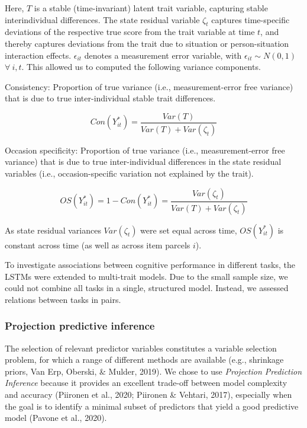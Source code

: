 \documentclass[
  man,floatsintext]{apa6}
\begin{document}
Here, \(T\) is a stable (time-invariant) latent trait variable, capturing stable interindividual differences. The state residual variable \(\zeta_t\) captures time-specific deviations of the respective true score from the trait variable at time \(t\), and thereby captures deviations from the trait due to situation or person-situation interaction effects. \(\epsilon_{it}\) denotes a measurement error variable, with \(\epsilon_{it} \sim N(0,1)\) \(\forall~ i,t\). This allowed us to computed the following variance components.

Consistency: Proportion of true variance (i.e., measurement-error free variance) that is due to true inter-individual stable trait differences.

\begin{equation}
Con(Y^*_{it})=\frac{Var(T)}{Var(T)+Var(\zeta_t)}
\end{equation}

Occasion specificity: Proportion of true variance (i.e., measurement-error free variance) that is due to true inter-individual differences in the state residual variables (i.e., occasion-specific variation not explained by the trait).

\begin{equation}
OS(Y^*_{it})=1-Con(Y^*_{it}) = \frac{Var(\zeta_t)}{Var(T)+Var(\zeta_t)}
\end{equation}

As state residual variances \(Var(\zeta_t)\) were set equal across time, \(OS(Y^*_{it})\) is constant across time (as well as across item parcels \(i\)).

To investigate associations between cognitive performance in different tasks, the LSTMs were extended to multi-trait models. Due to the small sample size, we could not combine all tasks in a single, structured model. Instead, we assessed relations between tasks in pairs.

\hypertarget{projection-predictive-inference}{%
\subsubsection{Projection predictive inference}\label{projection-predictive-inference}}

The selection of relevant predictor variables constitutes a variable selection problem, for which a range of different methods are available (e.g., shrinkage priors, Van Erp, Oberski, \& Mulder, 2019). We chose to use \emph{Projection Prediction Inference} because it provides an excellent trade-off between model complexity and accuracy (Piironen et al., 2020; Piironen \& Vehtari, 2017), especially when the goal is to identify a minimal subset of predictors that yield a good predictive model (Pavone et al., 2020).
\end{document}

